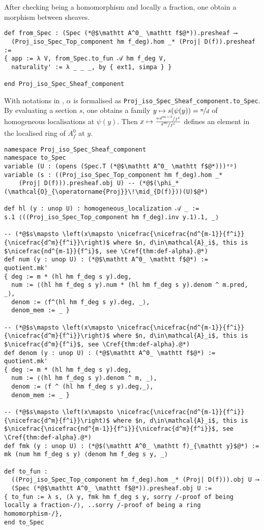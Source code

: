 \documentclass[a4paper,UKenglish,cleveref, autoref, thm-restate]{lipics-v2021}
\begin{document}
After checking being a homomorphism and locally a fraction, one obtain a morphism between sheaves.
\begin{lstlisting}
def from_Spec : (Spec (*@$\mathtt A^0_ \mathtt f$@*)).presheaf ⟶
  (Proj_iso_Spec_Top_component hm f_deg).hom _* (Proj| D(f)).presheaf :=
{ app := λ V, from_Spec.to_fun 𝒜 hm f_deg V,
  naturality' := λ _ _ _, by { ext1, simpa } }

end Proj_iso_Spec_Sheaf_component
\end{lstlisting}

With notations in , $\alpha$ is formalised as \lstinline{Proj_iso_Spec_Sheaf_component.to_Spec}. By evaluating a section $s$, one obtains a family $y\mapsto s(\psi(y))=\nicefrac{n}{d}$ of homogeneous localisations at $\psi(y)$. Then $x\mapsto \frac{\nicefrac{nd^{m-1}}{f^i}}{\nicefrac{d^m}{f^i}}$ defines an element in the localised ring of $A^0_f$ at $y$.
\begin{lstlisting}
namespace Proj_iso_Spec_Sheaf_component
namespace to_Spec
variable (U : (opens (Spec.T (*@$\mathtt A^0_ \mathtt f$@*)))ᵒᵖ)
variable (s : ((Proj_iso_Spec_Top_component hm f_deg).hom _* 
    (Proj| D(f))).presheaf.obj U) -- (*@$(\phi_* (\mathcal{O}_{\operatorname{Proj}}\!\mid_{D(f)}))(U)$@*)

def hl (y : unop U) : homogeneous_localization 𝒜 _ :=
s.1 ⟨((Proj_iso_Spec_Top_component hm f_deg).inv y.1).1, _⟩

-- (*@$s\mapsto \left(x\mapsto \nicefrac{\nicefrac{nd^{m-1}}{f^i}}{\nicefrac{d^m}{f^i}}\right)$ where $n, d\in\mathcal{A}_i$, this is $\nicefrac{nd^{m-1}}{f^i}$, see \Cref{thm:def-alpha}.@*)
def num (y : unop U) : (*@$\mathtt A^0_ \mathtt f$@*) :=
quotient.mk'
{ deg := m * (hl hm f_deg s y).deg,
  num := ⟨(hl hm f_deg s y).num * (hl hm f_deg s y).denom ^ m.pred, _⟩,
  denom := ⟨f^(hl hm f_deg s y).deg, _⟩,
  denom_mem := _ }

-- (*@$s\mapsto \left(x\mapsto \nicefrac{\nicefrac{nd^{m-1}}{f^i}}{\nicefrac{d^m}{f^i}}\right)$ where $n, d\in\mathcal{A}_i$, this is $\nicefrac{d^m}{f^i}$, see \Cref{thm:def-alpha}.@*)
def denom (y : unop U) : (*@$\mathtt A^0_ \mathtt f$@*) :=
quotient.mk'
{ deg := m * (hl hm f_deg s y).deg,
  num := ⟨(hl hm f_deg s y).denom ^ m, _⟩,
  denom := ⟨f ^ (hl hm f_deg s y).deg,_⟩,
  denom_mem := _ }

-- (*@$s\mapsto \left(x\mapsto \nicefrac{\nicefrac{nd^{m-1}}{f^i}}{\nicefrac{d^m}{f^i}}\right)$ where $n, d\in\mathcal{A}_i$, this is $\nicefrac{\nicefrac{nd^{m-1}}{f^i}}{\nicefrac{d^m}{f^i}}$, see \Cref{thm:def-alpha}.@*)
def fmk (y : unop U) : (*@$(\mathtt A^0_ \mathtt f)_{\mathtt y}$@*) :=
mk (num hm f_deg s y) ⟨denom hm f_deg s y, _⟩

def to_fun : 
  ((Proj_iso_Spec_Top_component hm f_deg).hom _* (Proj| D(f))).obj U ⟶ 
  (Spec (*@$\mathtt A^0_ \mathtt f$@*)).presheaf.obj U :=
{ to_fun := λ s, ⟨λ y, fmk hm f_deg s y, sorry /-proof of being locally a fraction-/⟩, ..sorry /-proof of being a ring homomorphism-/},
end to_Spec
\end{lstlisting}
\end{document}
